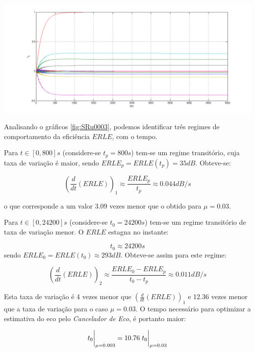 \documentclass[a4paper,11pt]{report}
\begin{document}
\begin{center}
     \includegraphics[angle=0,width=1\textwidth]{SRu0003t.png}
     \label{fig:SRu0003t}
     \end{center}

Analisando o gráficos  \ref{fig:SRu0003}, podemos identificar três regimes de comportamento da eficiência $ERLE$, com o tempo. 

Para $t\in[0,800] s$ (considere-se $t_{p}=800s$) tem-se um regime transitório, cuja taxa de variação é maior, sendo $ERLE_p=ERLE(t_p)=35dB$. Obteve-se:

$$\left(\frac{d}{dt}\left(ERLE\right)\right)_{1}\approx{\frac{ERLE_{p}}{t_{p}}}\approx0.044dB/s$$ 

o que corresponde a um valor 3.09 vezes menor que o obtido para $\mu=0.03$.\\
\par
Para $t\in[0,24200] s$ (considere-se $t_{0}=24200s$) tem-se um regime transitório de taxa de variação menor. O $ERLE$ estagna no instante:

$$t_{0}\approx24200s$$ sendo $ERLE_{0}=ERLE(t_{0})\approx293dB$. Obteve-se assim para este regime:


$$\left(\frac{d}{dt}\left(ERLE\right)\right)_{2}\approx{\frac{ERLE_{0}-ERLE_p}{t_{0}-t_p}}\approx0.011dB/s$$ 

Esta taxa de variação é 4 vezes menor que $\left(\frac{d}{dt}\left(ERLE\right)\right)_{1}$ e 12.36 vezes menor que a taxa de variação para o caso $\mu=0.03$. O tempo necessário para optimizar a estimativa do eco pelo \textit{Cancelador de Eco}, é portanto maior:

$$t_{0}\bigg{|}_{\mu=0.003}=10.76\hspace{3pt}t_{0}\bigg{|}_{\mu=0.03}$$
\end{document}

